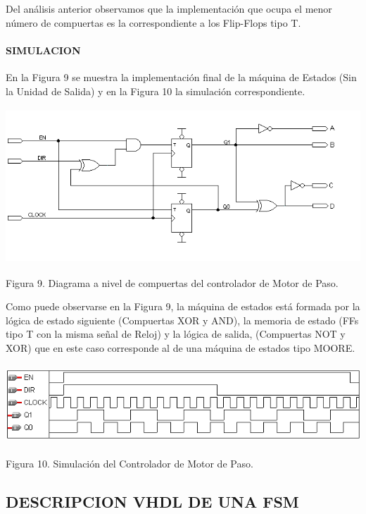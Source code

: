 Del análisis anterior observamos que la implementación que ocupa el menor número de compuertas es la correspondiente a los Flip-Flops tipo T.

\paragraph[\ SIMULACION]{  SIMULACION}

En la Figura 9 se muestra la implementación final de la máquina de Estados (Sin la Unidad de Salida) y en la Figura 10 la simulación correspondiente.

{\centering \includegraphics[width=13.778cm,height=5.817cm]{./images/FSM-img9.png} \par}

{\centering Figura 9. Diagrama a nivel de compuertas del controlador de Motor de Paso.\par}

Como puede observarse en la Figura 9, la máquina de estados está formada por la lógica de estado siguiente (Compuertas XOR y AND), la memoria de
estado (FFs tipo T con la misma señal de Reloj) y la lógica de salida, (Compuertas NOT y XOR) que en este caso corresponde al de una máquina de estados tipo MOORE.


{\centering \includegraphics[width=14.984cm,height=2.953cm]{./images/FSM-img10.png} \par}

{\centering Figura 10. Simulación del Controlador de Motor de Paso. \par}

\subsection[DESCRIPCION VHDL DE UNA FSM]{ DESCRIPCION VHDL DE UNA FSM}

